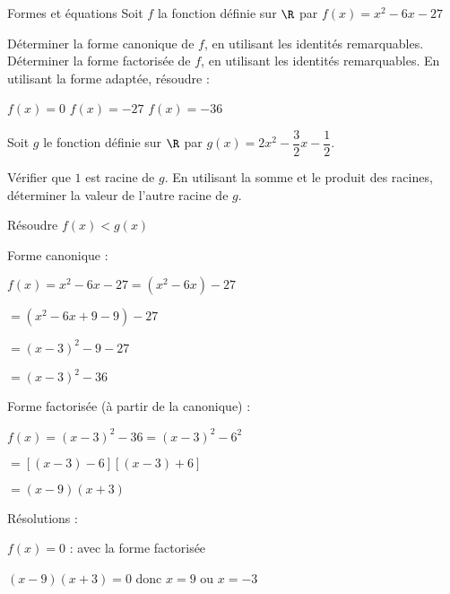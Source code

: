 \def\rdifficulty{3}
\begin{EXO}{Formes et équations}{}
Soit $f$ la fonction définie sur $\R$ par $f(x)=x^2-6x-27$
\begin{tcbenumerate}[2]
\tcbitem {} Déterminer la forme canonique de $f$, en utilisant les identités remarquables.
\tcbitem {} Déterminer la forme factorisée de $f$, en utilisant les identités remarquables.
\tcbitem[boxrule=0.4pt,colframe=black,raster multicolumn=2] En utilisant la forme adaptée, résoudre :
\vspace{-2mm}
\begin{tcbenumerate}[3][1][alph]
\tcbitem {} $f(x)=0$
\tcbitem {} $f(x)=-27$
\tcbitem {} $f(x)=-36$\\
\end{tcbenumerate}
\tcbitem[boxrule=0.4pt,colframe=black,raster multicolumn=2] Soit $g$ le fonction définie sur $\R$ par $g(x)=2x^2-\dfrac{3}{2}x-\dfrac{1}{2}$.
\begin{tcbenumerate}[2][1][alph]
\tcbitem {} Vérifier que $1$ est racine de $g$.
\tcbitem {} En utilisant la somme et le produit des racines, déterminer la valeur de l'autre racine de $g$.
\end{tcbenumerate}
\tcbitem {} Résoudre $f(x)<g(x)$
\end{tcbenumerate}

\exocorrection

\begin{tcbenumerate}[1]
\tcbitem Forme canonique :

$f(x) = x^2 - 6x - 27 = (x^2 - 6x) - 27$

$= (x^2 - 6x + 9 - 9) - 27$

$= (x-3)^2 - 9 - 27$

$= (x-3)^2 - 36$

\tcbitem Forme factorisée (à partir de la canonique) :

$f(x) = (x-3)^2 - 36 = (x-3)^2 - 6^2$

$= [(x-3) - 6][(x-3) + 6]$

$= (x-9)(x+3)$

\tcbitem Résolutions :
\begin{tcbenumerate}[1][1][alph]
\tcbitem $f(x)=0$ : avec la forme factorisée

$(x-9)(x+3) = 0$ donc $x = 9$ ou $x = -3$


\end{tcbenumerate}
\end{tcbenumerate}
\end{EXO}
